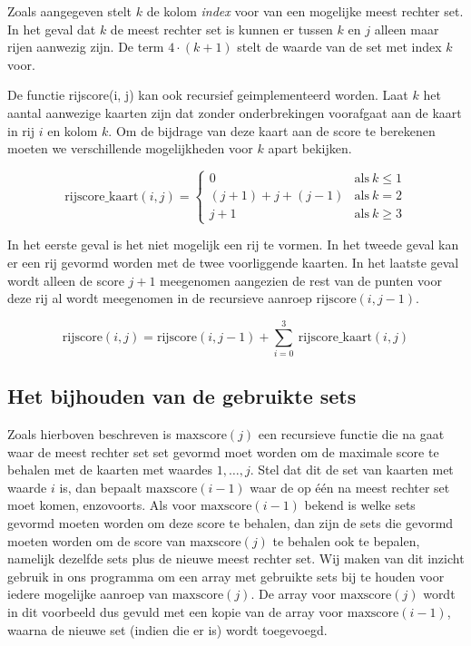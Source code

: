 \documentclass{article}
\begin{document}
Zoals aangegeven stelt $k$ de kolom \emph{index} voor van een mogelijke meest rechter set. In het geval dat $k$ de meest rechter set is kunnen er tussen $k$ en $j$ alleen maar rijen aanwezig zijn. De term $4 \cdot (k + 1)$ stelt de waarde van de set met index $k$ voor. 

De functie rijscore(i, j) kan ook recursief geimplementeerd worden. Laat $k$ het aantal aanwezige kaarten zijn dat zonder onderbrekingen voorafgaat aan de kaart in rij $i$ en kolom $k$. Om de bijdrage van deze kaart aan de score te berekenen moeten we verschillende mogelijkheden voor $k$ apart bekijken.

$$
\text{rijscore\_kaart}(i, j) = \begin{cases}
    0 & \text{als} \ k \le 1 \\
    (j + 1) + j + (j - 1) & \text{als} \  k = 2 \\
    j + 1 & \text{als} \  k \ge 3
\end{cases}
$$

In het eerste geval is het niet mogelijk een rij te vormen. In het tweede geval kan er een rij gevormd worden met de twee voorliggende kaarten. In het laatste geval wordt alleen de score $j + 1$ meegenomen aangezien de rest van de punten voor deze rij al wordt meegenomen in de recursieve aanroep $\text{rijscore}(i, j - 1)$.

$$
\text{rijscore}(i, j) = \text{rijscore}(i, j - 1) + \sum_{i = 0}^{3} \  \text{rijscore\_kaart}(i, j)
$$

\subsection{Het bijhouden van de gebruikte sets}

Zoals hierboven beschreven is $\text{maxscore}(j)$ een recursieve functie die na gaat waar de meest rechter set set gevormd moet worden om de maximale score te behalen met de kaarten met waardes $1, \ldots, j$. Stel dat dit de set van kaarten met waarde $i$ is, dan bepaalt $\text{maxscore}(i - 1)$ waar de op één na meest rechter set moet komen, enzovoorts.
Als voor $\text{maxscore}(i - 1)$ bekend is welke sets gevormd moeten worden om deze score te behalen, dan zijn de sets die gevormd moeten worden om de score van $\text{maxscore}(j)$ te behalen ook te bepalen, namelijk dezelfde sets plus de nieuwe meest rechter set. Wij maken van dit inzicht gebruik in ons programma om een array met gebruikte sets bij te houden voor iedere mogelijke aanroep van $\text{maxscore}(j)$. De array voor $\text{maxscore}(j)$ wordt in dit voorbeeld dus gevuld met een kopie van de array voor $\text{maxscore}(i - 1)$, waarna de nieuwe set (indien die er is) wordt toegevoegd.
\end{document}
